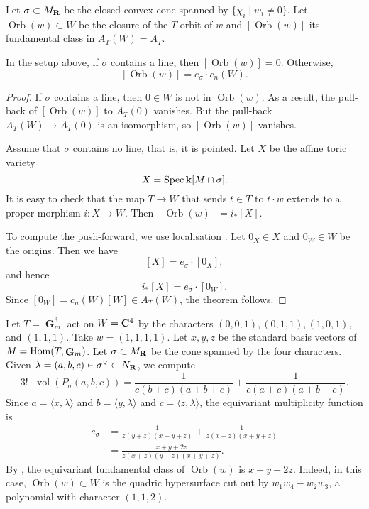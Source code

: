 \documentclass{amsart}
\renewcommand{\k}{\mathbf k}
\DeclareMathOperator{\G}{\mathbf G}
\DeclareMathOperator{\Orb}{Orb}
\begin{document}
 Let \(\sigma \subset M_{{\bf R}}\) be the closed convex cone spanned by \(\{\chi_i \mid w_i \neq 0\}\).
 Let \(\Orb(w) \subset W\) be the closure of the \(T\)-orbit of \(w\) and \([\Orb(w)]\) its fundamental class in \(A_{T}(W) = A_{T}\).
 \begin{theorem}\label{thm:torus}
   In the setup above, if \(\sigma\) contains a line, then \([\Orb(w)] = 0\).
   Otherwise,
   \[ [\Orb(w)] = e_{\sigma} \cdot c_n(W).\]
 \end{theorem}
 \begin{proof}
   If \(\sigma\) contains a line, then \(0 \in W\) is not in \(\Orb(w)\).
   As a result, the pull-back of \([\Orb(w)]\) to \(A_{T}(0)\) vanishes.
   But the pull-back \(A_T(W) \to A_T(0)\) is an isomorphism, so \([\Orb(w)]\) vanishes.

   Assume that \(\sigma\) contains no line, that is, it is pointed.
   Let \(X\) be the affine toric variety
   \[ X = \spec \k[M \cap \sigma].\]
   It is easy to check that the map \(T \to W\) that sends \(t \in T\) to \(t \cdot w\) extends to a proper morphism \(i \colon X \to W\).
   Then \([\Orb(w)] = i_{*}[X]\).

   To compute the push-forward, we use localisation \cite[\S~4.2 Corollary]{bri:97}.
   Let \(0_X \in X\) and \(0_W \in W\) be the origins.
   Then we have
   \[ [X] = e_{\sigma} \cdot [0_X],\]
   and hence
   \[ i_{*}[X] = e_{\sigma} \cdot [0_W].\]
   Since \([0_{W}] = c_{n}(W)[W]\in A_{T}(W)\), the theorem follows.
 \end{proof}

 \begin{example}
   Let \(T = \G_m^3\) act on \(W = {\bf C}^{4}\) by the characters \((0,0,1), (0,1,1), (1,0,1),\) and \((1,1,1)\).
   Take \(w = (1,1,1,1)\).
   Let \(x,y,z\) be the standard basis vectors of \(M=\Hom(T,\G_m)\).
   Let \(\sigma \subset M_{{\bf R}}\) be the cone spanned by the four characters.
   Given \(\lambda = (a,b,c) \in \sigma^{\vee} \subset N_{{\bf R}}\), we compute
   \[ 3! \cdot \operatorname{vol}(P_{\sigma}(a,b,c)) = \frac{1}{c(b+c)(a+b+c)} + \frac{1}{c(a+c)(a+b+c)}.\]
   Since \(a = \langle x, \lambda \rangle\) and \(b = \langle  y, \lambda \rangle\) and \(c = \langle z, \lambda \rangle\), the equivariant multiplicity function is
   \begin{align*}
     e_{\sigma} &= \frac{1}{z(y+z)(x+y+z)} + \frac{1}{z(x+z)(x+y+z)}\\
&= \frac{x+y+2z}{z(x+z)(y+z)(x+y+z)}.                  
   \end{align*}
   By , the equivariant fundamental class of \(\Orb(w)\) is \(x+y+2z\).
   Indeed, in this case, \(\Orb(w) \subset W\) is the quadric hypersurface cut out by \(w_1w_4-w_2w_3\), a polynomial with character \((1,1,2)\).
 \end{example}
 
\end{document}
